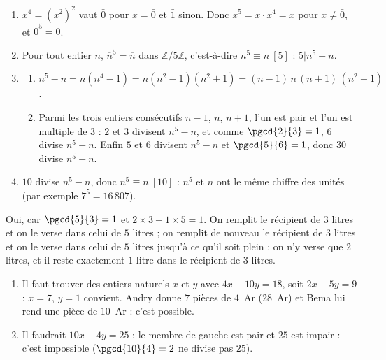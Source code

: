 \begin{corrige}
\begin{sol}
\begin{enumerate}
      Si $n^2$ se terminait par $2$ ou $7$, on aurait $n^2 \equiv 2 \ [5]$ ; s'il se terminait par $3$ ou $8$, on aurait $n^2 \equiv 3 \ [5]$.
      Or un carr\'e est congru \`a $0$, $1$ ou $4$ modulo $5$ : c'est impossible.
\item $x^4 = (x^2)^2$ vaut $\bar{0}$ pour $x = \bar{0}$ et $\bar{1}$ sinon. Donc $x^5 = x \cdot x^4 = x$ pour $x \neq \bar{0}$, et $\bar{0}^5 = \bar{0}$.
\item Pour tout entier $n$, $\overline{n}^5 = \overline{n}$ dans $\mathbb{Z}/5\mathbb{Z}$, c'est-\`a-dire $n^5 \equiv n \ [5]$ : $5 | n^5 - n$.
\item \begin{enumerate}
      \item $n^5 - n = n(n^4 - 1) = n(n^2 - 1)(n^2 + 1) = (n-1)\,n\,(n+1)\,(n^2+1)$.
      \item Parmi les trois entiers cons\'ecutifs $n-1$, $n$, $n+1$, l'un est pair et l'un est multiple de $3$ :
            $2$ et $3$ divisent $n^5 - n$, et comme $\pgcd{2}{3} = 1$, $6$ divise $n^5 - n$.
            Enfin $5$ et $6$ divisent $n^5 - n$ et $\pgcd{5}{6} = 1$, donc $30$ divise $n^5 - n$.
      \end{enumerate}
\item $10$ divise $n^5 - n$, donc $n^5 \equiv n \ [10]$ : $n^5$ et $n$ ont le m\^eme chiffre des unit\'es
      (par exemple $7^5 = 16\,807$).
\end{enumerate}
\end{sol}
%
\begin{sol}
Oui, car $\pgcd{5}{3} = 1$ et $2 \times 3 - 1 \times 5 = 1$. On remplit le r\'ecipient de $3$ litres et on le verse dans celui de $5$ litres ;
on remplit de nouveau le r\'ecipient de $3$ litres et on le verse dans celui de $5$ litres jusqu'\`a ce qu'il soit plein :
on n'y verse que $2$ litres, et il reste exactement $1$ litre dans le r\'ecipient de $3$ litres.
\end{sol}
%
\begin{sol}
\begin{enumerate}
\item Il faut trouver des entiers naturels $x$ et $y$ avec $4x - 10y = 18$, soit $2x - 5y = 9$ :
      $x = 7$, $y = 1$ convient. Andry donne $7$ pi\`eces de $4$~Ar ($28$~Ar) et Bema lui rend une pi\`ece de $10$~Ar : c'est possible.
\item Il faudrait $10x - 4y = 25$ ; le membre de gauche est pair et $25$ est impair : c'est impossible
      ($\pgcd{10}{4} = 2$ ne divise pas $25$).

\end{enumerate}
\end{sol}
\end{corrige}
